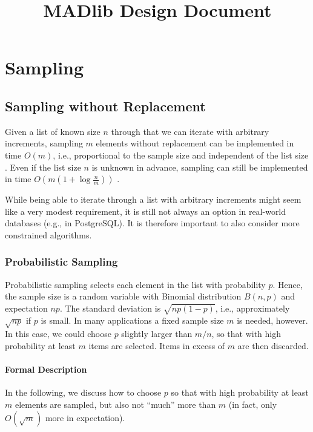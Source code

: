 \documentclass[letterpaper,11pt]{scrreprt}
\title{%
	MADlib Design Document%
}
\numberwithin{equation}{section}
\theoremstyle{algorithm}
\begin{document}
\maketitle

\tableofcontents

\chapter{Sampling}

\section{Sampling without Replacement} \label{sec:SampingWOReplacement}

Given a list of known size $n$ through that we can iterate with arbitrary increments, sampling $m$ elements without replacement can be implemented in time $O(m)$, i.e., proportional to the sample size and independent of the list size \cite{V84a}. Even if the list size $n$ is unknown in advance, sampling can still be implemented in time $O(m(1 + \log \frac nm))$ \cite{V85a}.

While being able to iterate through a list with arbitrary increments might seem like a very modest requirement, it is still not always an option in real-world databases (e.g., in PostgreSQL). It is therefore important to also consider more constrained algorithms.

\subsection{Probabilistic Sampling}

Probabilistic sampling selects each element in the list with probability $p$. Hence, the sample size is a random variable with Binomial distribution $B(n, p)$ and expectation $np$. The standard deviation is $\sqrt{np(1 - p)}$, i.e., approximately $\sqrt{np}$ if $p$ is small. In many applications a fixed sample size $m$ is needed, however. In this case, we could choose $p$ slightly larger than $m/n$, so that with high probability at least $m$ items are selected. Items in excess of $m$ are then discarded.

\subsubsection{Formal Description}

In the following, we discuss how to choose $p$ so that with high probability at least $m$ elements are sampled, but also not ``much'' more than $m$ (in fact, only $O(\sqrt m)$ more in expectation).
\end{document}
